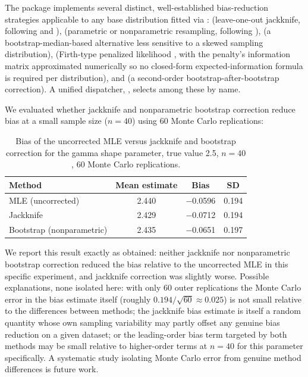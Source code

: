 \documentclass[article]{jss}
\begin{document}
The package implements several distinct, well-established bias-reduction strategies applicable to any base distribution fitted via :  (leave-one-out jackknife, following \citealp{quenouille1956} and \citealp{tukey1958}),  (parametric or nonparametric resampling, following \citealp{efron1979}),  (a bootstrap-median-based alternative less sensitive to a skewed sampling distribution),  (Firth-type penalized likelihood \citealp{firth1993}, with the penalty's information matrix approximated numerically so no closed-form expected-information formula is required per distribution), and  (a second-order bootstrap-after-bootstrap correction). A unified dispatcher, , selects among these by name.

We evaluated whether jackknife and nonparametric bootstrap correction reduce bias at a small sample size ($n=40$) using 60 Monte Carlo replications:

\begin{table}[htbp]
\centering
\begin{tabular}{@{}lccc@{}}
\toprule
Method & Mean estimate & Bias & SD \\
\midrule
MLE (uncorrected) & 2.440 & $-$0.0596 & 0.194 \\
Jackknife & 2.429 & $-$0.0712 & 0.194 \\
Bootstrap (nonparametric) & 2.435 & $-$0.0651 & 0.197 \\
\bottomrule
\end{tabular}
\caption{Bias of the uncorrected MLE versus jackknife and bootstrap correction for the gamma shape parameter, true value 2.5, $n=40$, 60 Monte Carlo replications.}
\label{tab:bias-correction}
\end{table}

We report this result exactly as obtained: neither jackknife nor nonparametric bootstrap correction reduced the bias relative to the uncorrected MLE in this specific experiment, and jackknife correction was slightly worse. Possible explanations, none isolated here: with only 60 outer replications the Monte Carlo error in the bias estimate itself (roughly $0.194/\sqrt{60}\approx0.025$) is not small relative to the differences between methods; the jackknife bias estimate is itself a random quantity whose own sampling variability may partly offset any genuine bias reduction on a given dataset; or the leading-order bias term targeted by both methods may be small relative to higher-order terms at $n=40$ for this parameter specifically. A systematic study isolating Monte Carlo error from genuine method differences is future work.
\end{document}
